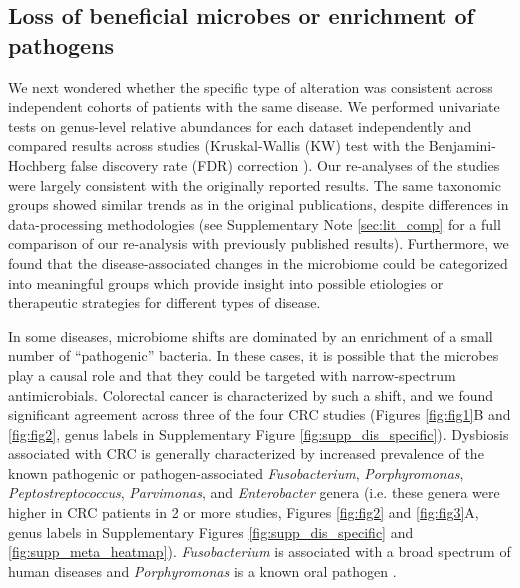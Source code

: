 \subsection*{Loss of beneficial microbes or enrichment of pathogens}

We next wondered whether the specific type of alteration was consistent across independent cohorts of patients with the same disease.
We performed univariate tests on genus-level relative abundances for each dataset independently and compared results across studies (Kruskal-Wallis (KW) test with the Benjamini-Hochberg false discovery rate (FDR) correction \cite{benjamini-hochberg}).
Our re-analyses of the studies were largely consistent with the originally reported results.
The same taxonomic groups showed similar trends as in the original publications, despite differences in data-processing methodologies (see Supplementary Note \ref{sec:lit_comp} for a full comparison of our re-analysis with previously published results).
Furthermore, we found that the disease-associated changes in the microbiome could be categorized into meaningful groups which provide insight into possible etiologies or therapeutic strategies for different types of disease.

In some diseases, microbiome shifts are dominated by an enrichment of a small number of ``pathogenic'' bacteria.
In these cases, it is possible that the microbes play a causal role and that they could be targeted with narrow-spectrum antimicrobials.
Colorectal cancer is characterized by such a shift, and we found significant agreement across three of the four CRC studies \cite{crc-zhao,crc-baxter,crc-zeller,crc-xiang} (Figures \ref{fig:fig1}B and \ref{fig:fig2}, genus labels in Supplementary Figure \ref{fig:supp_dis_specific}).
Dysbiosis associated with CRC is generally characterized by increased prevalence of the known pathogenic or pathogen-associated \textit{Fusobacterium}, \textit{Porphyromonas}, \textit{Peptostreptococcus}, \textit{Parvimonas}, and \textit{Enterobacter} genera (i.e. these genera were higher in CRC patients in 2 or more studies, Figures \ref{fig:fig2} and \ref{fig:fig3}A, genus labels in Supplementary Figures \ref{fig:supp_dis_specific} and \ref{fig:supp_meta_heatmap}).
\textit{Fusobacterium} is associated with a broad spectrum of human diseases and \textit{Porphyromonas} is a known oral pathogen \cite{Han2015fusopatho, Flynn2016oral}.

